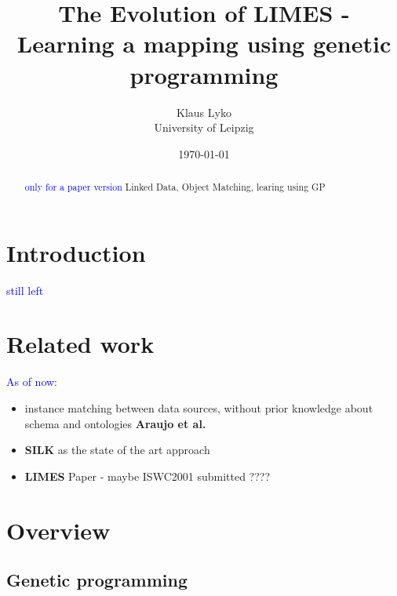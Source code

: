\documentclass{article}%
\begin{document}
\author{Klaus Lyko \\ University of Leipzig}
\title{The Evolution of LIMES - Learning a mapping using genetic programming}
\date{\today}
\maketitle


\begin{abstract}
\textcolor{blue}{only for a paper version}
Linked Data, Object Matching, learing using GP
\end{abstract}

\newpage
\tableofcontents
{}
\newpage
\section{Introduction}
\textcolor{blue}{still left}
\section{Related work}
\textcolor{blue}{
As of now:}
\begin{itemize}
	\item instance matching between data sources, without prior knowledge about schema and ontologies \textbf{Araujo et al.} \cite{AraujoHidders2011}
	\item \textbf{SILK} as  the state of the art approach \cite{VolzBizer2009a, VolzBizer2009b}
	\item \textbf{LIMES} Paper - maybe ISWC2001 submitted ????
\end{itemize}
\section{Overview}

\subsection{Genetic programming}
\end{document}

